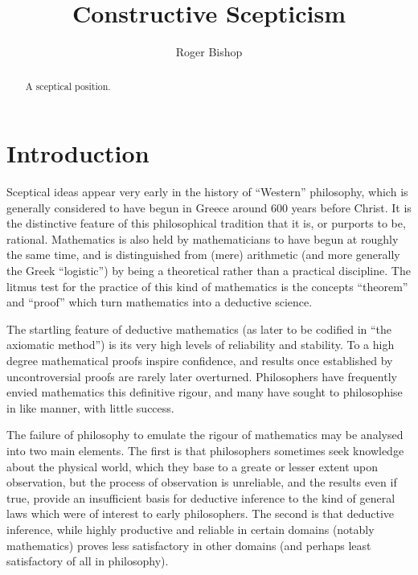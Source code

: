 \documentclass{rbjk}
\begin{document}
                                                                                   
\begin{article}
\begin{opening}  
\title{Constructive Scepticism}
\author{Roger Bishop }

\begin{abstract}
A sceptical position.
\end{abstract}
\end{opening}

\setcounter{tocdepth}{4}
{\parskip-0pt\tableofcontents}

\section{Introduction}

Sceptical ideas appear very early in the history of ``Western'' philosophy, which is generally considered to have begun in Greece around 600 years before Christ.
It is the distinctive feature of this philosophical tradition that it is, or purports to be, rational.
Mathematics is also held by mathematicians to have begun at roughly the same time, and is distinguished from (mere) arithmetic (and more generally the Greek ``logistic'') by being a theoretical rather than a practical discipline.
The litmus test for the practice of this kind of mathematics is the concepts ``theorem'' and ``proof'' which turn mathematics into a deductive science.

The startling feature of deductive mathematics (as later to be codified in ``the axiomatic method'') is its very high levels of reliability and stability.
To a high degree mathematical proofs inspire confidence, and results once established by uncontroversial proofs are rarely later overturned.
Philosophers have frequently envied mathematics this definitive rigour, and many have sought to philosophise in like manner, with little success.

The failure of philosophy to emulate the rigour of mathematics may be analysed into two main elements.
The first is that philosophers sometimes seek knowledge about the physical world, which they base to a greate or lesser extent upon observation, but the process of observation is unreliable, and the results even if true, provide an insufficient basis for deductive inference to the kind of general laws which were of interest to early philosophers.
The second is that deductive inference, while highly productive and reliable in certain domains (notably mathematics) proves less satisfactory in other domains (and perhaps least satisfactory of all in philosophy).


\end{article}
\end{document}
